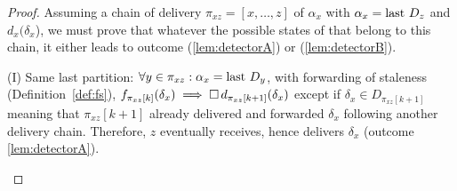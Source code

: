\begin{proof}
  Assuming a chain of delivery $\pi_{xz} = [x, \ldots, z]$ of
  $\alpha_x$ with $\alpha_x = \textup{last}~ D_z$ and $d_x(\delta_x$), we must
  prove that whatever the possible states of \nodes that belong to
  this chain, it either leads to outcome (\ref{lem:detectorA}) or
  (\ref{lem:detectorB}).
  \begin{asparadesc}
  \item [(I) Same last partition:] $\forall y \in \pi_{xz}: \alpha_x =
    \textup{last}~ D_y$, with forwarding of staleness
    (Definition~\ref{def:fs}), $f_{\pi_{xz}[k]}(\delta_x) \implies
    \square\, d_{\pi_{xz}[k+1]}(\delta_x)$ except if $\delta_x \in
    D_{\pi_{xz}[k+1]}$ meaning that $\pi_{xz}[k+1]$ already
    delivered and forwarded $\delta_x$ following another 
    delivery chain. Therefore, $z$ eventually receives, hence delivers
    $\delta_x$ (outcome \ref{lem:detectorA}).
    

\end{asparadesc}
\end{proof}
